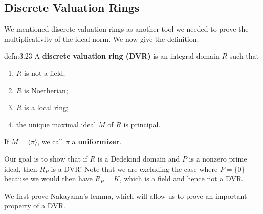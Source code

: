 \subsection{Discrete Valuation Rings} \label{subsec:3.6}
We mentioned discrete valuation rings as another tool we needed to 
prove the multiplicativity of the ideal norm. We now give the definition. 

\begin{defn}{defn:3.23}
    A {\bf discrete valuation ring (DVR)} is an integral domain $R$ such that 
    \begin{enumerate}[(1)]
        \item $R$ is not a field;
        \item $R$ is Noetherian;
        \item $R$ is a local ring;
        \item the unique maximal ideal $M$ of $R$ is principal.
    \end{enumerate}
    If $M = \langle \pi \rangle$, we call $\pi$ a {\bf uniformizer}.
\end{defn}\vspace{-0.25cm}
Our goal is to show that if $R$ is a Dedekind domain and $P$ is a nonzero 
prime ideal, then $R_P$ is a DVR! Note that we are excluding the case 
where $P = \{0\}$ because we would then have $R_P = K$, which is a field 
and hence not a DVR. 

We first prove Nakayama's lemma, which will allow us 
to prove an important property of a DVR.

